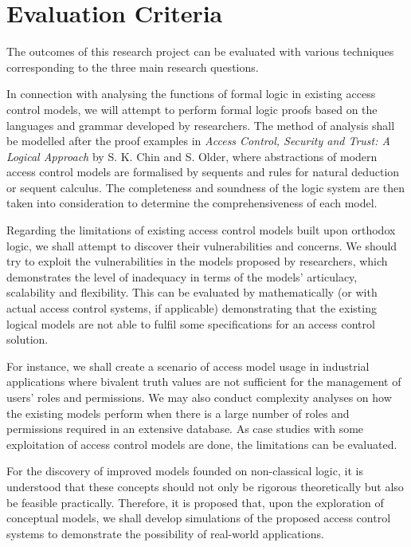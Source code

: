 \documentclass{article}
\begin{document}
\section*{Evaluation Criteria}

The outcomes of this research project can be evaluated with various techniques
corresponding to the three main research questions.

In connection with analysing the functions of formal logic in existing access
control models, we will attempt to perform formal logic proofs based on the
languages and grammar developed by researchers. The method of analysis shall
be modelled after the proof examples in \textit{Access Control, Security and
Trust: A Logical Approach} by S. K. Chin and S. Older\cite{proofs}, where
abstractions of modern access control models are formalised by sequents
and rules for natural deduction or sequent calculus. The completeness and
soundness of the logic system are then taken into consideration to determine
the comprehensiveness of each model.

Regarding the limitations of existing access control models built upon
orthodox logic, we shall attempt to discover their vulnerabilities and
concerns. We should try to exploit the vulnerabilities in the models proposed
by researchers, which demonstrates the level of inadequacy in terms of the
models' articulacy, scalability\cite{distributed-systems} and flexibility. This
can be evaluated by mathematically (or with actual access control systems,
if applicable) demonstrating that the existing logical models are not able
to fulfil some specifications for an access control solution.

For instance, we shall create a scenario of access model usage in industrial
applications where bivalent truth values are not sufficient for the management
of users' roles and permissions. We may also conduct complexity analyses
on how the existing models perform when there is a large number of roles
and permissions required in an extensive database. As case studies with
some exploitation of access control models are done, the limitations can
be evaluated.

For the discovery of improved models founded on non-classical logic, it is
understood that these concepts should not only be rigorous theoretically
but also be feasible practically. Therefore, it is proposed that, upon
the exploration of conceptual models, we shall develop simulations of the
proposed access control systems to demonstrate the possibility of real-world
applications.
\end{document}
